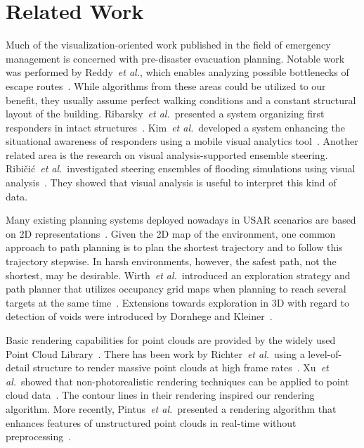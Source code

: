\documentclass[conference,10pt,letter]{IEEEtran}
\def\etal{\textit{et al.}}
\begin{document}

\section{Related Work} \label{sec:relatedwork}
 Much of the visualization-oriented work published in the field of emergency management is concerned with pre-disaster evacuation planning. Notable work was performed by Reddy~\etal, which enables analyzing possible bottlenecks of escape routes~\cite{EuroVA12:13-17:2012}. While algorithms from these areas could be utilized to our benefit, they usually assume perfect walking conditions and a constant structural layout of the building. Ribarsky~\etal\ presented a system organizing first responders in intact structures~\cite{Ribarsky:2010}. Kim~\etal\ developed a system enhancing the situational awareness of responders using a mobile visual analytics tool~\cite{Kim:2008}. Another related area is the research on visual analysis-supported ensemble steering. Ribi\v{c}i\'c~\etal\ investigated steering ensembles of flooding simulations using visual analysis~\cite{6280550}. They showed that visual analysis is useful to interpret this kind of data.

Many existing planning systems deployed nowadays in USAR scenarios are based on 2D representations~\cite{kleiner_et_al_ssrr09,KohlbrecherMeyerStrykKlingaufFlexibleSlamSystem2011,Pellenz2009SMU}. Given the 2D map of the environment, one common approach to path planning is to plan the shortest trajectory and to follow this trajectory stepwise. In harsh environments, however, the safest path, not the shortest, may be desirable. Wirth~\etal\ introduced an exploration strategy and path planner that utilizes occupancy grid maps when planning to reach several targets at the same time~\cite{Wirth2007ETA1}. Extensions towards exploration in 3D with regard to detection of voids were introduced by Dornhege and Kleiner~\cite{dornhege2011frontier}.

 Basic rendering capabilities for point clouds are provided by the widely used Point Cloud Library~\cite{Rusu11ICRA}. There has been work by Richter~\etal\ using a level-of-detail structure to render massive point clouds at high frame rates~\cite{Richter:2010:ORV:1811158.1811178}. Xu~\etal\ showed that non-photorealistic rendering techniques can be applied to point cloud data~\cite{conf/npar/XuC04}. The contour lines in their rendering inspired our rendering algorithm. More recently, Pintus~\etal\ presented a rendering algorithm that enhances features of unstructured point clouds in real-time without preprocessing~\cite{Pintus:2011:RRM:2384495.2384513}.
\end{document}
